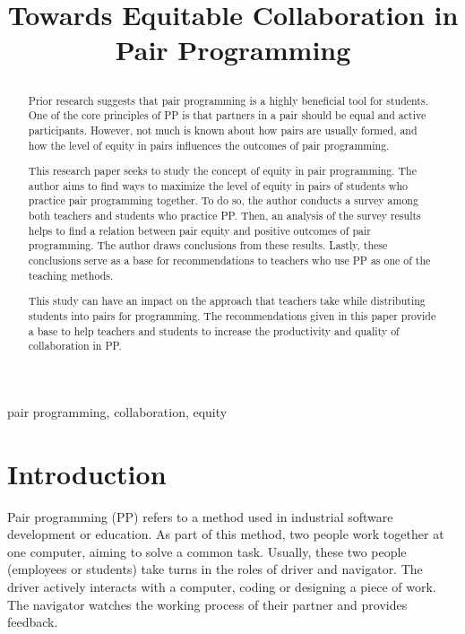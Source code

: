 \documentclass[conference]{IEEEtran}
\begin{document}
\title{Towards Equitable Collaboration in Pair Programming\\

\author{
}
}

\maketitle

\begin{abstract}
Prior research suggests that pair programming is a highly beneficial tool for students. One of the core principles of PP is that partners in a pair should be equal and active participants. However, not much is known about how pairs are usually formed, and how the level of equity in pairs influences the outcomes of pair programming.

This research paper seeks to study the concept of equity in pair programming. The author aims to find ways to maximize the level of equity in pairs of students who practice pair programming together. To do so, the author conducts a survey among both teachers and students who practice PP. Then, an analysis of the survey results helps to find a relation between pair equity and positive outcomes of pair programming. The author draws conclusions from these results. Lastly, these conclusions serve as a base for recommendations to teachers who use PP as one of the teaching methods.

This study can have an impact on the approach that teachers take while distributing students into pairs for programming. The recommendations given in this paper provide a base to help teachers and students to increase the productivity and quality of collaboration in PP.

\end{abstract}

\begin{IEEEkeywords}
pair programming, collaboration, equity
\end{IEEEkeywords}

\section{Introduction}
Pair programming (PP) refers to a method used in industrial software development or education. As part of this method, two people work together at one computer, aiming to solve a common task. Usually, these two people (employees or students) take turns in the roles of driver and navigator. The driver actively interacts with a computer, coding or designing a piece of work. The navigator watches the working process of their partner and provides feedback. 
\end{document}
